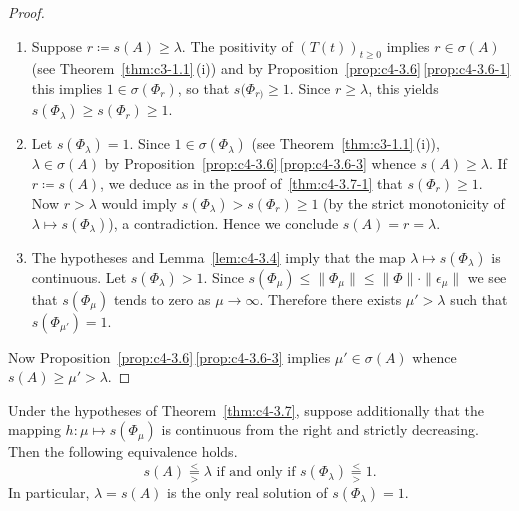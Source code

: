 \begin{proof}
\begin{enumerate}[\upshape (i), wide, labelindent=.25em] 
\item%
Suppose $r \coloneqq s(A) \geq \lambda$. 
The positivity of\/ $(T(t))_{t \geq 0}$ implies $r \in \sigma(A)$ (see Theorem~\ref{thm:c3-1.1}\,(i)) and by Proposition~\ref{prop:c4-3.6}\,\ref{prop:c4-3.6-1}  this implies $1 \in \sigma(\Phi_r)$, so that $s(\Phi_{r)} \geq 1$. 
Since $r \geq \lambda$, this yields $s(\Phi_{\lambda}) \geq s(\Phi_{r}) \geq 1$.

\item 
Let $s(\Phi_{\lambda}) = 1$. 
Since $1 \in \sigma(\Phi_{\lambda})$ (see Theorem~\ref{thm:c3-1.1}\,(i)), $\lambda \in \sigma(A)$ by Proposition~\ref{prop:c4-3.6}\,\ref{prop:c4-3.6-3} whence $s(A) \geq \lambda$. 
If\/ $r \coloneqq s(A)$, we deduce as in the proof of~\ref{thm:c4-3.7-1} that $s(\Phi_{r}) \geq 1$. 
Now $r > \lambda$ would imply $s(\Phi_{\lambda}) > s(\Phi_{r}) \geq 1$ (by the strict monotonicity of\/ $\lambda \mapsto s(\Phi_{\lambda})$), a contradiction. Hence we conclude $s(A) = r = \lambda$.

\item 
The hypotheses and Lemma~\ref{lem:c4-3.4} imply that the map $\lambda \mapsto s(\Phi_{\lambda})$ is continuous. 
Let $s(\Phi_{\lambda}) > 1$. 
Since $s(\Phi_{\mu}) \leq \|\Phi_{\mu}\| \leq \|\Phi\| \cdot \|\epsilon_{\mu}\|$ we see that $s(\Phi_{\mu})$ tends to zero as $\mu \to \infty$. 
Therefore there exists $\mu' > \lambda$ such that $s(\Phi_{\mu'}) = 1$. 
\end{enumerate} 
Now Proposition~\ref{prop:c4-3.6}\,\ref{prop:c4-3.6-3}  implies $\mu' \in \sigma(A)$ whence $s(A) \geq \mu' > \lambda$.
\end{proof}
\begin{corollary}\label{cor:c4-3.8}
%
Under the hypotheses of Theorem~\ref{thm:c4-3.7}, suppose additionally that the mapping $h: \mu \mapsto s(\Phi_{\mu})$ is continuous from the right and strictly decreasing. Then the following equivalence holds.
\begin{equation}\label{eq:c4-3.9}
s(A) 
\overset{<}{ \underset{>}{=} }
\lambda 
\text{ if and only if } 
s(\Phi_{\lambda}) 
\overset{<}{ \underset{>}{=} }
1 .
\end{equation}
In particular, $\lambda = s(A)$ is the only real solution of\/ $s(\Phi_{\lambda}) = 1$.
\end{corollary}
